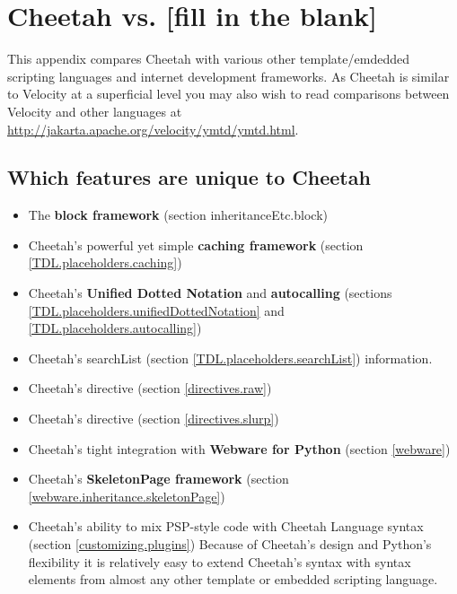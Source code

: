 \section{Cheetah vs. [fill in the blank]}
\label{comparisons}

This appendix compares Cheetah with various other template/emdedded scripting
languages and internet development frameworks.  As Cheetah is similar to
Velocity at a superficial level you may also wish to read comparisons between
Velocity and other languages at
\url{http://jakarta.apache.org/velocity/ymtd/ymtd.html}.

\subsection{Which features are unique to Cheetah}
\label{comparisons.unique}

\begin{itemize}
\item The {\bf block framework} (section {inheritanceEtc.block})
\item Cheetah's powerful yet simple {\bf caching framework} (section
     \ref{TDL.placeholders.caching})
\item Cheetah's {\bf Unified Dotted Notation} and {\bf autocalling}
     (sections \ref{TDL.placeholders.unifiedDottedNotation} and
     \ref{TDL.placeholders.autocalling})
\item Cheetah's searchList (section \ref{TDL.placeholders.searchList})
     information.
\item Cheetah's  directive (section \ref{directives.raw})
\item Cheetah's  directive (section \ref{directives.slurp})
\item Cheetah's tight integration with {\bf Webware for Python} (section
     \ref{webware})
\item Cheetah's {\bf SkeletonPage framework} (section
     \ref{webware.inheritance.skeletonPage})
\item Cheetah's ability to mix PSP-style code with Cheetah
     Language syntax (section \ref{customizing.plugins}) 
     Because of Cheetah's design and Python's flexibility it is
     relatively easy to extend Cheetah's syntax with syntax elements from almost
     any other template or embedded scripting language.
\end{itemize}



